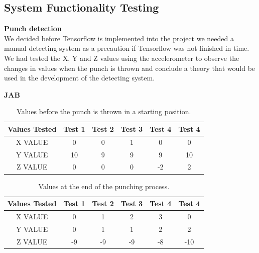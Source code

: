 \documentclass[a4paper,12pt]{report}
\begin{document}
\subsection{System Functionality Testing}
\textbf{Punch detection}\\
We decided before Tensorflow is implemented into the project we needed a manual detecting system as a precaution if Tensorflow was not finished in time. We had tested the X, Y and Z values using the accelerometer to observe the changes in values when the punch is thrown and conclude a theory that would be used in the development of the detecting system.
\begin{center}
    \textbf{JAB}
\end{center}{}
\begin{table}[h]
    \centering
    \begin{tabular}{||c c c c c c||} 
     \hline
     \textbf{Values Tested} & \textbf{Test 1} & \textbf{Test 2} & \textbf{Test 3} & \textbf{Test 4} & \textbf{Test 4} \\ [0.5ex] 
     \hline\hline
     X VALUE & 0 & 0 & 1 & 0 & 0\\ 
     \hline
     Y VALUE & 10 & 9 & 9 & 9 & 10\\  
     \hline
     Z VALUE & 0 & 0 & 0 & -2 & 2\\
     \hline
    \end{tabular}
    \caption{Values before the punch is thrown in a starting position.}
    \label{tab:jabBeforet}
\end{table}

\begin{table}[h]
    \centering
    \begin{tabular}{||c c c c c c||} 
     \hline
     \textbf{Values Tested} & \textbf{Test 1} & \textbf{Test 2} & \textbf{Test 3} & \textbf{Test 4} & \textbf{Test 4} \\ [0.5ex] 
     \hline\hline
     X VALUE & 0 & 1 & 2 & 3 & 0\\ 
     \hline
     Y VALUE & 0 & 1 & 1 & 2 & 2\\  
     \hline
     Z VALUE & -9 & -9 & -9 & -8 & -10\\
     \hline
    \end{tabular}
    \caption{Values at the end of the punching process.}
    \label{tab:jabAfter}
\end{table}
\end{document}
